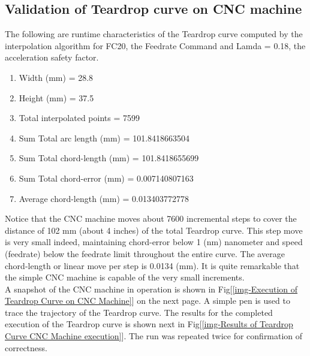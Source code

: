 \subsection{Validation of Teardrop curve on CNC machine}

\noindent The following are runtime characteristics of the Teardrop curve computed by the interpolation algorithm for FC20, the Feedrate Command and Lamda = 0.18, the acceleration safety factor. 

\begin{enumerate}
\item Width  (mm)   = 28.8
\item Height (mm)   = 37.5
\item Total interpolated points   = 7599
\item Sum Total arc   length (mm) = 101.8418663504 
\item Sum Total chord-length (mm) = 101.8418655699 
\item Sum Total chord-error  (mm) = 0.007140807163 
\item Average chord-length   (mm) = 0.013403772778 	
\end{enumerate}

\noindent Notice that the CNC machine moves about 7600 incremental steps to cover the distance of 102 mm (about 4 inches) of the total Teardrop curve. This step move is very small indeed, maintaining chord-error below 1 (nm) nanometer and speed (feedrate) below the feedrate limit throughout the entire curve. The average chord-length or linear move per step is 0.0134 (mm). It is quite remarkable that the simple CNC machine is capable of the very small increments. \\

\noindent A snapshot of the CNC machine in operation is shown in Fig[\ref{img-Execution of Teardrop Curve on CNC Machine}] on the next page. A simple pen is used to trace the trajectory of the Teardrop curve. The results for the completed execution of the Teardrop curve is shown next in Fig[\ref{img-Results of Teardrop Curve CNC Machine execution}]. The run was repeated twice for confirmation of correctness.

\clearpage
\pagebreak


